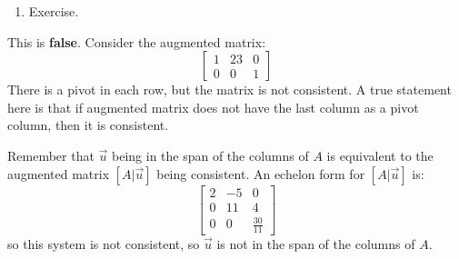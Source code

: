 \documentclass[12pt,letterpaper]{article}
\begin{document}
\begin{enumerate}
\begin{enumerate}
  \item
   Exercise.
  \end{enumerate}

  \Answer This is {\bf false}. Consider the augmented matrix:
  \[
    \left[
      \begin{array}{cc|c}
        1&23&0\\
        0&0&1
      \end{array}
    \right]
  \]
  There is a pivot in each row, but the matrix is not consistent. A true statement here is that if augmented matrix does not have the last column as a pivot column, then it is consistent. 

  \Answer Remember that $\vec{u}$ being in the span of the columns of $A$ is equivalent to the augmented matrix $[A|\vec{u}]$ being consistent. An echelon form for $[A|\vec{u}]$ is:
  \[
    \left[
      \begin{array}{cc|c}
        2&-5&0\\
        0&11&4\\
        0&0&\frac{30}{11}
      \end{array}
    \right]
  \] so this system is not consistent, so $\vec{u}$ is not in the span of the columns of $A$. 

 \end{enumerate}
\end{document}

